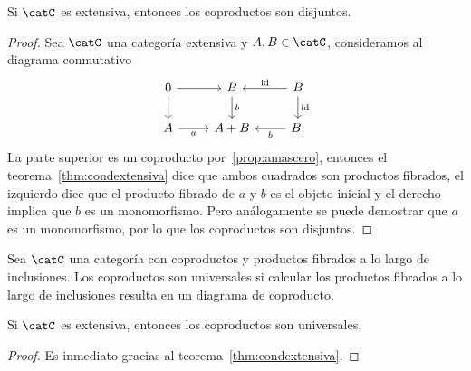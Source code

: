 \begin{proposition}
  Si $\catC$ es extensiva, entonces los coproductos son disjuntos.
\end{proposition}
\begin{proof}
  Sea $\catC$ una categoría extensiva y $A,B\in\catC$, consideramos al diagrama conmutativo
  \begin{equation*}
    \begin{tikzcd}
      0\ar{r}{}\ar[swap]{d}{} & B\ar{d}{b} & B\ar[swap]{l}{\id}\ar{d}{\id} \\
      A\ar[swap]{r}{a} & A+B & B.\ar{l}{b}
    \end{tikzcd}
  \end{equation*}
La parte superior es un coproducto por~\ref{prop:amascero}, entonces el teorema~\ref{thm:condextensiva} dice que ambos cuadrados 
son productos fibrados, el izquierdo dice que el producto fibrado de $a$ y $b$ es el objeto inicial
y el derecho implica que $b$ es un monomorfismo. Pero análogamente se puede demostrar que
$a$ es un monomorfismo, por lo que los coproductos son disjuntos.
\end{proof}

\begin{definition}
  Sea $\catC$ una categoría con coproductos y productos fibrados a lo largo de inclusiones.
  Los coproductos son universales si calcular los productos fibrados a lo largo de inclusiones
  resulta en un diagrama de coproducto.
\end{definition}

\begin{corollary}
  Si $\catC$ es extensiva, entonces los coproductos son universales.
\end{corollary}
\begin{proof}
  Es inmediato gracias al teorema~\ref{thm:condextensiva}.
\end{proof}

